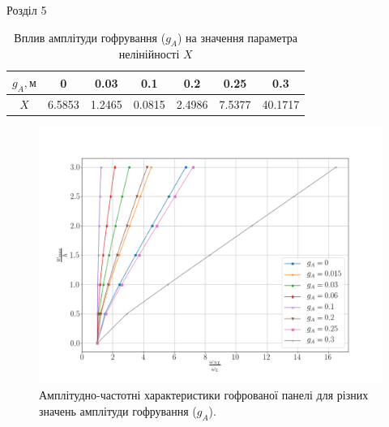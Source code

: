 \documentclass[8pt]{beamer}
\numberwithin{figure}{section}
\numberwithin{equation}{section}
\numberwithin{table}{section}
\begin{document}
\begin{frame}{Розділ 5}

\begin{table}[h!]
\caption{Вплив амплітуди гофрування ($g_A$) на значення параметра нелінійності $X$}
\centering
 \begin{tabular}{| c | c | c | c | c | c | c |} 
 \hline
 $g_A, м$ & 0 & 0.03 & 0.1 & 0.2 & 0.25 & 0.3 \\ 
  \hline
 $X$ & 6.5853 & 1.2465 & 0.0815 & 2.4986 & 7.5377 & 40.1717 \\
   \hline
\end{tabular}
\end{table}
\begin{figure}
	\includegraphics[scale=0.21]{pic/corrugated_ampl_nonlinear_s.png}
		\caption{Амплітудно-частотні характеристики гофрованої панелі для різних значень амплітуди гофрування ($g_A$).}
\end{figure}

\end{frame}
\end{document}
